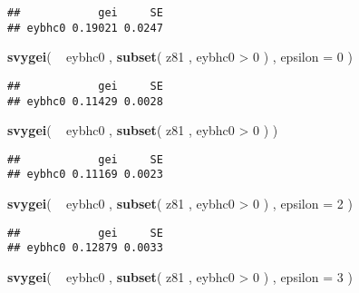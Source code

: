 \documentclass[]{book}
\newenvironment{Shaded}{\begin{snugshade}}{\end{snugshade}}
\newcommand{\KeywordTok}[1]{\textcolor[rgb]{0.13,0.29,0.53}{\textbf{{#1}}}}
\newcommand{\DataTypeTok}[1]{\textcolor[rgb]{0.13,0.29,0.53}{{#1}}}
\newcommand{\DecValTok}[1]{\textcolor[rgb]{0.00,0.00,0.81}{{#1}}}
\newcommand{\StringTok}[1]{\textcolor[rgb]{0.31,0.60,0.02}{{#1}}}
\newcommand{\NormalTok}[1]{{#1}}
\begin{document}
\begin{verbatim}
##            gei     SE
## eybhc0 0.19021 0.0247
\end{verbatim}

\begin{Shaded}
\begin{Highlighting}[]
\KeywordTok{svygei}\NormalTok{( ~}\StringTok{ }\NormalTok{eybhc0 , }\KeywordTok{subset}\NormalTok{( z81 , eybhc0 >}\StringTok{ }\DecValTok{0} \NormalTok{) , }\DataTypeTok{epsilon =} \DecValTok{0} \NormalTok{)}
\end{Highlighting}
\end{Shaded}

\begin{verbatim}
##            gei     SE
## eybhc0 0.11429 0.0028
\end{verbatim}

\begin{Shaded}
\begin{Highlighting}[]
\KeywordTok{svygei}\NormalTok{( ~}\StringTok{ }\NormalTok{eybhc0 , }\KeywordTok{subset}\NormalTok{( z81 , eybhc0 >}\StringTok{ }\DecValTok{0} \NormalTok{) )}
\end{Highlighting}
\end{Shaded}

\begin{verbatim}
##            gei     SE
## eybhc0 0.11169 0.0023
\end{verbatim}

\begin{Shaded}
\begin{Highlighting}[]
\KeywordTok{svygei}\NormalTok{( ~}\StringTok{ }\NormalTok{eybhc0 , }\KeywordTok{subset}\NormalTok{( z81 , eybhc0 >}\StringTok{ }\DecValTok{0} \NormalTok{) , }\DataTypeTok{epsilon =} \DecValTok{2} \NormalTok{)}
\end{Highlighting}
\end{Shaded}

\begin{verbatim}
##            gei     SE
## eybhc0 0.12879 0.0033
\end{verbatim}

\begin{Shaded}
\begin{Highlighting}[]
\KeywordTok{svygei}\NormalTok{( ~}\StringTok{ }\NormalTok{eybhc0 , }\KeywordTok{subset}\NormalTok{( z81 , eybhc0 >}\StringTok{ }\DecValTok{0} \NormalTok{) , }\DataTypeTok{epsilon =} \DecValTok{3} \NormalTok{)}
\end{Highlighting}
\end{Shaded}
\end{document}
